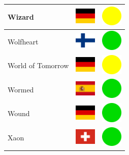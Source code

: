 \documentclass[12pt, a4paper, twoside]{report}
\begin{document}
\begin{center}
\begin{longtable}{|p{5cm}|p{2cm}|p{2cm}|}
Wizard & \includegraphics[width=1cm]{4x3/de} & \includegraphics[width=1cm]{likes/m} \\ \hline
Wolfheart & \includegraphics[width=1cm]{4x3/fi} & \includegraphics[width=1cm]{likes/y} \\ \hline
World of Tomorrow & \includegraphics[width=1cm]{4x3/de} & \includegraphics[width=1cm]{likes/m} \\ \hline
Wormed & \includegraphics[width=1cm]{4x3/es} & \includegraphics[width=1cm]{likes/y} \\ \hline
Wound & \includegraphics[width=1cm]{4x3/de} & \includegraphics[width=1cm]{likes/y} \\ \hline
Xaon & \includegraphics[width=1cm]{4x3/ch} & \includegraphics[width=1cm]{likes/y} \\ \hline

\end{longtable}
\end{center}
\end{document}
